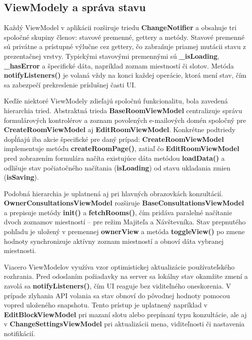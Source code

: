 \subsection{ViewModely a správa stavu}

Každý ViewModel v aplikácii rozširuje triedu \textbf{ChangeNotifier} a obsahuje tri spoločné skupiny členov: stavové premenné, gettery a metódy. Stavové premenné sú privátne a prístupné výlučne cez gettery, čo zabraňuje priamej mutácii stavu z prezentačnej vrstvy. Typickými stavovými premennými sú \textbf{\_isLoading}, \textbf{\_hasError} a špecifické dáta, napríklad zoznam miestností či slotov. Metóda \textbf{notifyListeners()} je volaná vždy na konci každej operácie, ktorá mení stav, čím sa zabezpečí prekreslenie príslušnej časti UI.

Keďže niektoré ViewModely zdieľajú spoločnú funkcionalitu, bola zavedená hierarchia tried. Abstraktná trieda \textbf{BaseRoomViewModel} centralizuje správu formulárových kontrolérov a zoznam povolených e-mailových domén spoločný pre \textbf{CreateRoomViewModel} aj \textbf{EditRoomViewModel}. Konkrétne podtriedy dopĺňajú iba akcie špecifické pre daný prípad: \textbf{CreateRoomViewModel} implementuje metódu \textbf{createRoomPage()}, zatiaľ čo \textbf{EditRoomViewModel} pred zobrazením formulára načíta existujúce dáta metódou \textbf{loadData()} a odlišuje stav počiatočného načítania (\textbf{isLoading}) od stavu ukladania zmien (\textbf{isSaving}).

Podobná hierarchia je uplatnená aj pri hlavných obrazovkách konzultácií. \textbf{OwnerConsultationsViewModel} rozširuje \textbf{BaseConsultationsViewModel} a prepisuje metódy \textbf{init()} a \textbf{fetchRooms()}, čím pridáva paralelné načítanie dvoch zoznamov miestností – pre režim Majiteľa a Návštevníka. Stav prepnutého pohľadu je uložený v premennej \textbf{ownerView} a metóda \textbf{toggleView()} po zmene hodnoty synchronizuje aktívny zoznam miestností a obnoví dáta vybranej miestnosti.

Viacero ViewModelov využíva vzor optimistickej aktualizácie používateľského rozhrania. Pred odoslaním požiadavky na server sa lokálny stav okamžite zmení a zavolá sa \textbf{notifyListeners()}, čím UI reaguje bez viditeľného oneskorenia. V prípade zlyhania API volania sa stav obnoví do pôvodnej hodnoty pomocou vopred uloženého snapshotu. Tento prístup je uplatnený napríklad v \textbf{EditBlockViewModel} pri mazaní slotu alebo prepínaní typu konzultácie, ale aj v \textbf{ChangeSettingsViewModel} pri aktualizácii mena, viditeľnosti či nastavenia notifikácií.

